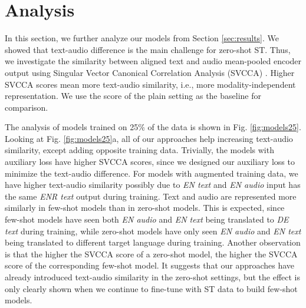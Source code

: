 \documentclass[conference]{IEEEtran}
\begin{document}
	
	\section{Analysis} \label{sec:analysis}
	In this section, we further analyze our models from Section \ref{sec:results}. We showed that text-audio difference is the main challenge for zero-shot ST. Thus, we investigate the similarity between aligned text and audio mean-pooled encoder output using Singular Vector Canonical Correlation Analysis (SVCCA) \cite{NIPS2017_7188}. Higher SVCCA scores mean more text-audio similarity, i.e., more modality-independent representation. We use the score of the plain setting as the baseline for comparison. 
	
	The analysis of models trained on 25\% of the data is shown in Fig. \ref{fig:models25}. Looking at Fig. \ref{fig:models25}a, all of our approaches help increasing text-audio similarity, except adding opposite training data. Trivially, the models with auxiliary loss have higher SVCCA scores, since we designed our auxiliary loss to minimize the text-audio difference. For models with augmented training data, we have higher text-audio similarity possibly due to \textit{EN text} and \textit{EN audio} input has the same \textit{ENR text} output during training. Text and audio are represented more similarly in few-shot models than in zero-shot models. This is expected, since few-shot models have seen both \textit{EN audio} and \textit{EN text} being translated to \textit{DE text} during training, while zero-shot models have only seen \textit{EN audio} and \textit{EN text} being translated to different target language during training. Another observation is that the higher the SVCCA score of a zero-shot model, the higher the SVCCA score of the corresponding few-shot model. It suggests that our approaches have already introduced text-audio similarity in the zero-shot settings, but the effect is only clearly shown when we continue to fine-tune with ST data to build few-shot models.
	
\end{document}
